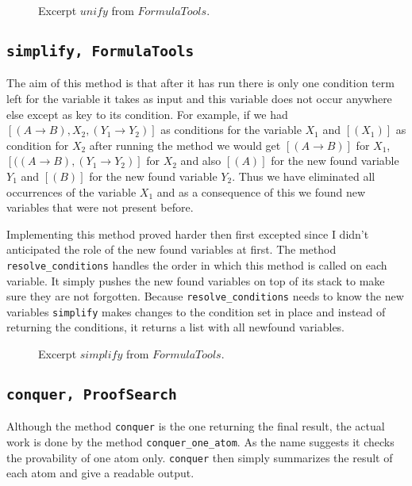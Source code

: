 \begin{figure}[H]
	\vspace{-10pt}
	
	\vspace{-10pt}
	\caption{Excerpt $unify$ from $FormulaTools$.}
	\vspace{-10pt}
\end{figure}


\subsection[simplify]{\texttt{simplify, FormulaTools}}

The aim of this method is that after it has run there is only one condition term left for the variable it takes as input and this variable does not occur anywhere else except as key to its condition. For example, if we had $ [(A \rightarrow B), X_2, (Y_1 \rightarrow Y_2)]$ as conditions for the variable $X_1$ and $[(X_1)]$ as condition for $X_2$ after running the method we would get $[(A \rightarrow B)]$ for $X_1$, $[((A \rightarrow B), (Y_1 \rightarrow Y_2)]$ for $X_2$ and also $[(A)]$ for the new found variable $Y_1$ and $[(B)]$ for the new found variable $Y_2$. Thus we have eliminated all occurrences of the variable $X_1$ and as a consequence of this we found new variables that were not present before. 

Implementing this method proved harder then first excepted since I didn't anticipated the role of the new found variables at first. The method \texttt{resolve\_conditions} handles the order in which this method is called on each variable. It simply pushes the new found variables on top of its stack to make sure they are not forgotten. Because \texttt{resolve\_conditions} needs to know the new variables \texttt{simplify} makes changes to the condition set in place and instead of returning the conditions, it returns a list with all newfound variables.

\begin{figure}[H]
	\vspace{-10pt}
	
	\vspace{-10pt}
	\caption{Excerpt $simplify$ from $FormulaTools$.}
	\vspace{-10pt}
\end{figure}


\subsection[conquer]{\texttt{conquer, ProofSearch}}
Although the method \texttt{conquer} is the one returning the final result, the actual work is done by the method \texttt{conquer\_one\_atom}. As the name suggests it checks the provability of one atom only. \texttt{conquer} then simply summarizes the result of each atom and give a readable output.

